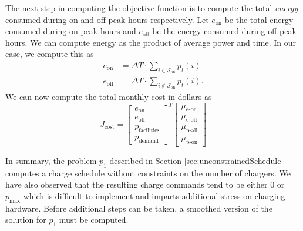 The next step in computing the objective function is to compute the total {\it energy} consumed during on and off-peak hours respectively.  Let $e_{\text{on}}$ be the total energy consumed during on-peak hours and $e_{\text{off}}$ be the energy consumed during off-peak hours. We can compute energy as the product of average power and time.  In our case, we compute this as 
\begin{equation}\label{eqn:objective:energy}\begin{aligned}
	e_{\text{on}} &= \Delta T\cdot \sum_{i \in \mathcal{S}_{\text{on}}}p_t(i) \\ 
	e_{\text{off}} &= \Delta T\cdot \sum_{i \notin \mathcal{S}_{\text{on}}}p_t(i).  
\end{aligned}\end{equation}
We can now compute the total monthly cost in dollars as
\begin{equation}\label{sec:unconstrainedSchedule:objective}
J_{\text{cost}} = \begin{bmatrix}e_{\text{on}} \\ e_{\text{off}} \\ p_{\text{facilities}} \\ p_{\text{demand}} \end{bmatrix}^T \begin{bmatrix} \mu_{\text{e-on}} \\ \mu_{\text{e-off}} \\ \mu_{\text{p-all}} \\ \mu_{\text{p-on}} \end{bmatrix} 
\end{equation}
\par In summary, the problem $p_1$ described in Section \ref{sec:unconstrainedSchedule} computes a charge schedule without constraints on the number of chargers. We have also observed that the resulting charge commands tend to be either $0$ or $p_{\text{max}}$ which is difficult to implement and imparts additional stress on charging hardware. Before additional steps can be taken, a smoothed version of the solution for $p_1$ must be computed.
\\[0.1in]  



